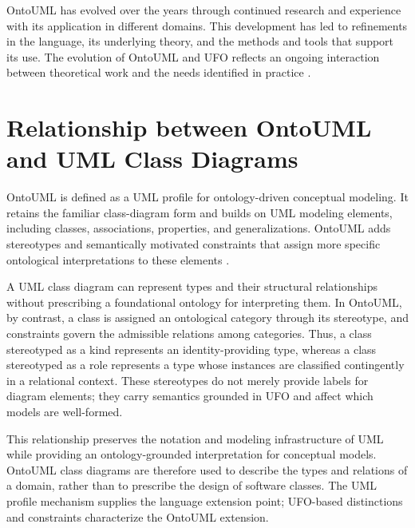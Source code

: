 OntoUML has evolved over the years through continued research and experience with its application in different domains. This development has led to refinements in the language, its underlying theory, and the methods and tools that support its use. The evolution of OntoUML and UFO reflects an ongoing interaction between theoretical work and the needs identified in practice \cite{towards_ontological_foundations_for_conceptual_modeling__the_unified_foundational_ontology__ufo__story_2015,endurant_types_in_ontology_driven_conceptual_modeling__towards_ontouml_2_0_2018}.

\section{Relationship between OntoUML and UML Class Diagrams}

OntoUML is defined as a UML profile for ontology-driven conceptual modeling. It retains the familiar class-diagram form and builds on UML modeling elements, including classes, associations, properties, and generalizations. OntoUML adds stereotypes and semantically motivated constraints that assign more specific ontological interpretations to these elements \cite{guizzardi_wagner_2010_ufo_foundation,towards_ontological_foundations_for_conceptual_modeling__the_unified_foundational_ontology__ufo__story_2015}.

A UML class diagram can represent types and their structural relationships without prescribing a foundational ontology for interpreting them. In OntoUML, by contrast, a class is assigned an ontological category through its stereotype, and constraints govern the admissible relations among categories. Thus, a class stereotyped as a kind represents an identity-providing type, whereas a class stereotyped as a role represents a type whose instances are classified contingently in a relational context. These stereotypes do not merely provide labels for diagram elements; they carry semantics grounded in UFO and affect which models are well-formed.

This relationship preserves the notation and modeling infrastructure of UML while providing an ontology-grounded interpretation for conceptual models. OntoUML class diagrams are therefore used to describe the types and relations of a domain, rather than to prescribe the design of software classes. The UML profile mechanism supplies the language extension point; UFO-based distinctions and constraints characterize the OntoUML extension.



